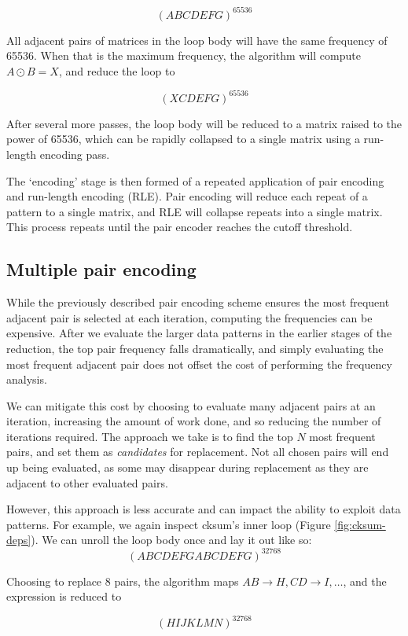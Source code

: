 $$
(A B C D E F G)^{65536}
$$

All adjacent pairs of matrices in the loop body will have the same frequency of 65536. When that is the maximum frequency, 
the algorithm will compute $A\odot B=X$, and reduce the loop to

$$
(X C D E F G)^{65536}
$$

After several more passes, the loop body will be reduced to a matrix raised to the power of 65536, which can 
be rapidly collapsed to a single matrix using a run-length encoding pass.

The `encoding' stage is then formed of a repeated application of pair encoding and run-length encoding (RLE). Pair encoding 
will reduce each repeat of a pattern to a single matrix, and RLE will collapse repeats into a single matrix.
This process repeats until the pair encoder reaches the cutoff threshold.

\subsection{Multiple pair encoding}

While the previously described pair encoding scheme ensures the most frequent adjacent pair is selected at each iteration,
computing the frequencies can be expensive. After we evaluate the larger data patterns in the earlier stages of the
reduction, the top pair frequency falls dramatically, and simply evaluating the most frequent adjacent pair does not offset
the cost of performing the frequency analysis.

We can mitigate this cost by choosing to evaluate many adjacent pairs at an iteration, increasing the amount of work done,
and so reducing the number of iterations required. The approach we take is to find the top $N$ most 
frequent pairs, and set them as \textit{candidates} for replacement. Not all chosen pairs will end up being evaluated, 
as some may disappear during replacement as they are adjacent to other evaluated pairs.

However, this approach is less accurate and can impact the ability to exploit data patterns. For example,
we again inspect cksum's inner loop (Figure \ref{fig:cksum-deps}).
We can unroll the loop body once and lay it out like so:
$$
(A B C D E F G A B C D E F G)^{32768}
$$

Choosing to replace 8 pairs, the algorithm maps $AB\to H, CD \to I, \dots$, and the expression is reduced to

$$
(H I J K L M N)^{32768}
$$

